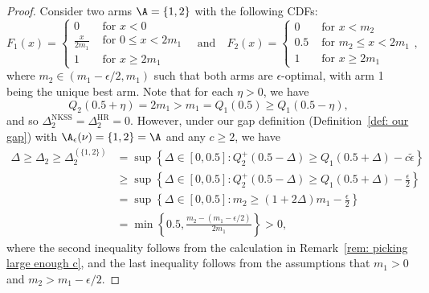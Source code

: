 \begin{proof}
    Consider two arms $\A = \{1, 2\}$ with the following CDFs:
\begin{equation}
    F_1(x) = 
    \begin{cases}
        0  & \text{ for } x < 0
        \\
        \frac{x}{2m_1} & \text{ for } 0 \le x < 2m_1 \\
        1 & \text{ for } x \ge 2m_1
    \end{cases}
    \quad \text{and} \quad
    F_2(x) = 
    \begin{cases}
        0 & \text{ for } x < m_2 \\
        0.5 & \text{ for } m_2 \le x < 2m_1 \\
        1 & \text{ for } x \ge 2 m_1
    \end{cases},
\end{equation}
where $ m_2 \in (m_1 - \epsilon/2, m_1)$
such that both arms are $\epsilon$-optimal, with arm 1 being the unique best arm. 
Note that for each $\eta > 0$, we have
\begin{equation}
    Q_2(0.5 + \eta) = 2 m_1
    > m_1 = Q_1(0.5) \ge Q_1(0.5 - \eta),
\end{equation}
and so $\Delta_2^{\mathrm{NKSS}} = \Delta_2^{\mathrm{HR}} = 0$.
However, under our gap definition (Definition~\ref{def: our gap}) with $\A_{\epsilon}(\nu) = \{1, 2\} = \A$ and any $c \ge 2$, we have
\begin{align}
    \Delta \ge \Delta_2 
    \ge \Delta_{2}^{(\{1,2\})}
    &=
    \sup
    \left\{
        \Delta \in [0, 0.5]
        :
        Q^+_2(0.5 - \Delta) 
        \ge
        Q_{1}(0.5 + \Delta) - c\tilde{\epsilon}
        \right\} \\
    &\ge
    \sup
    \left\{
        \Delta  \in [0, 0.5]
        :
        Q^+_2(0.5 - \Delta) 
        \ge
        Q_{1}(0.5 + \Delta) - \frac{\epsilon}{2}
        \right\} \\    
    &=
    \sup
    \left\{
        \Delta  \in [0, 0.5]
        :
        m_2
        \ge
        (1+2 \Delta) m_1 - \frac{\epsilon}{2}
        \right\} \\
     &= \min\left\{0.5, \frac{m_2 - (m_1 - \epsilon/2)}{2m_1} \right\} >0,
\end{align}
where the second inequality follows from the calculation in Remark~\ref{rem: picking large enough c}, and the last inequality follows from the assumptions that $m_1 > 0$ and $m_2 > m_1 - \epsilon/2$.
\end{proof}


